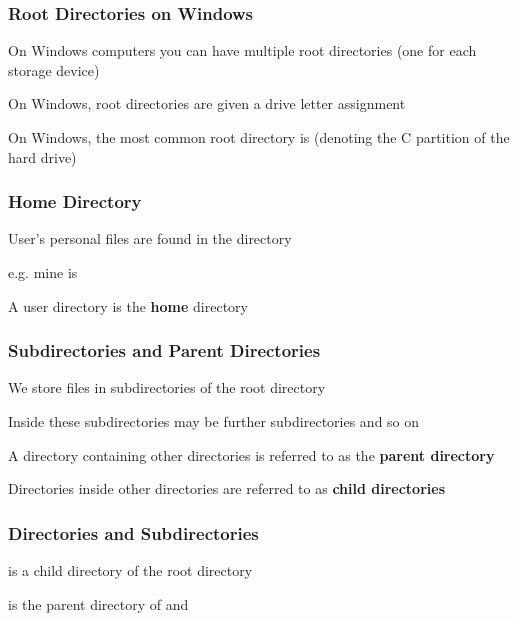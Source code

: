 \documentclass[12pt]{beamer}\usepackage[]{graphicx}\usepackage[]{color}
\begin{document}

\begin{frame}[fragile]
\frametitle{Root Directories on Windows}

\bi
  \item On Windows computers you can have multiple root directories (one for each storage device)
  \item On Windows, root directories are given a drive letter assignment
  \item On Windows, the most common root directory is {\hilit {}} (denoting the C partition of the hard drive)
\ei

\end{frame}


\begin{frame}
\frametitle{Home Directory}
\bi
  \item User's personal files are found in the  directory
  \item e.g. mine is 
  \item A user directory is the \textbf{home} directory
\ei
\end{frame}


\begin{frame}[fragile]
\frametitle{Subdirectories and Parent Directories}

\bi
  \item We store files in subdirectories of the root directory
  \item Inside these subdirectories may be further subdirectories and so on
  \item A directory containing other directories is referred to as the \textbf{parent directory}
  \item Directories inside other directories are referred to as \textbf{child directories}
\ei

\end{frame}


\begin{frame}[fragile]
\frametitle{Directories and Subdirectories}
\begin{center}
\end{center}

\bi
  \item {\hilit {}} is a child directory of the root directory
  \item {\hilit {}} is the parent directory of  and 
\ei

\end{frame}
\end{document}
